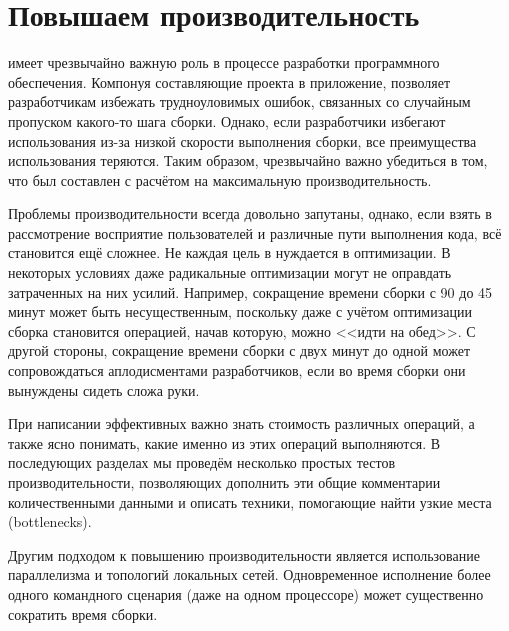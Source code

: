 \chapter{Повышаем производительность \GNUmake{}}
\label{chap:improving_the_performance}

\GNUmake{} имеет чрезвычайно важную роль в процессе разработки
программного обеспечения. Компонуя составляющие проекта в приложение,
\GNUmake{} позволяет разработчикам избежать трудноуловимых ошибок,
связанных со случайным пропуском какого-то шага сборки. Однако, если
разработчики избегают использования \GNUmake{} из-за низкой скорости
выполнения сборки, все преимущества использования \GNUmake{} теряются.
Таким образом, чрезвычайно важно убедиться в том, что \Makefile{} был
составлен с расчётом на максимальную производительность.

Проблемы производительности всегда довольно запутаны, однако, если
взять в рассмотрение восприятие пользователей и различные пути
выполнения кода, всё становится ещё сложнее. Не каждая цель в
 нуждается в оптимизации. В некоторых условиях даже
радикальные оптимизации могут не оправдать затраченных на них усилий. 
Например, сокращение времени сборки с 90 до 45 минут может быть
несущественным, поскольку даже с учётом оптимизации сборка становится
операцией, начав которую, можно <<идти на обед>>. С другой стороны,
сокращение времени сборки с двух минут до одной может сопровождаться
аплодисментами разработчиков, если во время сборки они вынуждены
сидеть сложа руки.

При написании эффективных  важно знать стоимость
различных операций, а также ясно понимать, какие именно из этих
операций выполняются. В последующих разделах мы проведём несколько
простых тестов производительности, позволяющих дополнить эти общие
комментарии количественными данными и описать техники, помогающие
найти узкие места (bottlenecks).

Другим подходом к повышению производительности является использование
параллелизма и топологий локальных сетей. Одновременное исполнение
более одного командного сценария (даже на одном процессоре) может
существенно сократить время сборки.






